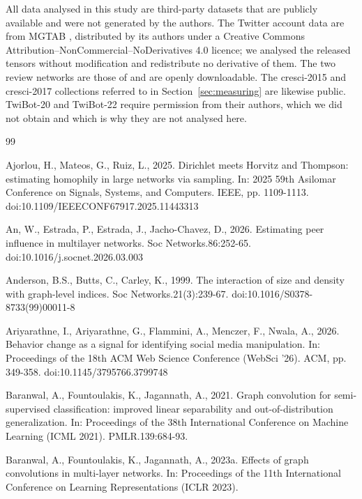 \documentclass[preprint,12pt,authoryear]{elsarticle}
\theoremstyle{definition}
\begin{document}
All data analysed in this study are third-party datasets that are publicly available
and were not generated by the authors. The Twitter account data are from MGTAB
\citep{shi2023mgtab}, distributed by its authors under a Creative Commons
Attribution--NonCommercial--NoDerivatives 4.0 licence; we analysed the released
tensors without modification and redistribute no derivative of them. The two review
networks are those of \citet{dou2020caregnn} and are openly downloadable. The
cresci-2015 and cresci-2017 collections referred to in
Section~\ref{sec:measuring} are likewise public. TwiBot-20 and TwiBot-22 require
permission from their authors, which we did not obtain and which is why they are not
analysed here.

\begin{thebibliography}{99}

Ajorlou, H., Mateos, G., Ruiz, L., 2025. Dirichlet meets Horvitz and Thompson: estimating homophily in large networks via sampling. In: 2025 59th Asilomar Conference on Signals, Systems, and Computers. IEEE, pp. 1109-1113. doi:10.1109/IEEECONF67917.2025.11443313

An, W., Estrada, P., Estrada, J., Jacho-Chavez, D., 2026. Estimating peer influence in multilayer networks. Soc Networks.86:252-65. doi:10.1016/j.socnet.2026.03.003

Anderson, B.S., Butts, C., Carley, K., 1999. The interaction of size and density with graph-level indices. Soc Networks.21(3):239-67. doi:10.1016/S0378-8733(99)00011-8

Ariyarathne, I., Ariyarathne, G., Flammini, A., Menczer, F., Nwala, A., 2026. Behavior change as a signal for identifying social media manipulation. In: Proceedings of the 18th ACM Web Science Conference (WebSci '26). ACM, pp. 349-358. doi:10.1145/3795766.3799748

Baranwal, A., Fountoulakis, K., Jagannath, A., 2021. Graph convolution for semi-supervised classification: improved linear separability and out-of-distribution generalization. In: Proceedings of the 38th International Conference on Machine Learning (ICML 2021). PMLR.139:684-93.

Baranwal, A., Fountoulakis, K., Jagannath, A., 2023a. Effects of graph convolutions in multi-layer networks. In: Proceedings of the 11th International Conference on Learning Representations (ICLR 2023).


\end{thebibliography}
\end{document}

